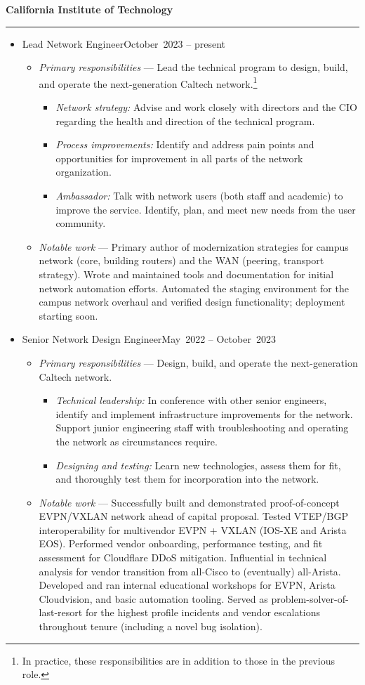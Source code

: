 \documentclass[10pt]{article}
\newenvironment{job}[5]
{
	\begin{leftcolumn*}
		\raggedleft{#3}
	\end{leftcolumn*}

	\begin{rightcolumn}
		\begin{itemize}[leftmargin=0em, itemindent=0em, labelsep=0.64em, topsep=0em, partopsep=0em]
			\item[\Large\textbullet]{#1}\hfill{}{#2}~{#3} -- {#4}~{#5}
			\begin{itemize}[leftmargin=1em, labelindent=\parindent]
}
{
			\end{itemize}
		\end{itemize}
	\end{rightcolumn}
}
\newenvironment{experience}
{
	\columnratio{0.05}
	\setlength{\columnsep}{2em}
	\setlength{\columnseprule}{0.4pt}
	\begin{paracol}{2}
}
{
	\end{paracol}
}
\newenvironment{employer}[1]
{
	\renewcommand{\employer}{{#1}}
	\begin{rightcolumn}
		\noindent\textbf{\employer}
		\smallskip
		{\color{lightgray}\hrule}
		\smallskip
	\end{rightcolumn}
}
{
	\let\employer\undefinedmacro
}
\begin{document}
\begin{experience}
	\begin{employer}{California Institute of Technology}
		\begin{job}{Lead Network Engineer}{October}{2023}{present}{}
			\item[]\emph{Primary responsibilities} --- Lead the technical program to design, build, and operate the next-generation Caltech network.\footnote{In practice, these responsibilities are in addition to those in the previous role.}
			\begin{itemize}
				\item\emph{Network strategy:} Advise and work closely with directors and the CIO regarding the health and direction of the technical program.
				\item\emph{Process improvements:} Identify and address pain points and opportunities for improvement in all parts of the network organization.
				\item\emph{Ambassador:} Talk with network users (both staff and academic) to improve the service. Identify, plan, and meet new needs from the user community.
			\end{itemize}
			\item[]\emph{Notable work} --- Primary author of modernization strategies for campus network (core, building routers) and the WAN (peering, transport strategy). Wrote and maintained tools and documentation for initial network automation efforts. Automated the staging environment for the campus network overhaul and verified design functionality; deployment starting soon.
		\end{job}
		\begin{job}{Senior Network Design Engineer}{May}{2022}{October}{2023}
			\item[]\emph{Primary responsibilities} --- Design, build, and operate the next-generation Caltech network.
			\begin{itemize}
				\item\emph{Technical leadership:} In conference with other senior engineers, identify and implement infrastructure improvements for the network. Support junior engineering staff with troubleshooting and operating the network as circumstances require.
				\item\emph{Designing and testing:} Learn new technologies, assess them for fit, and thoroughly test them for incorporation into the network.
			\end{itemize}
		\item[]\emph{Notable work} --- Successfully built and demonstrated proof-of-concept EVPN/VXLAN network ahead of capital proposal. Tested VTEP/BGP interoperability for multivendor EVPN + VXLAN (IOS-XE and Arista EOS). Performed vendor onboarding, performance testing, and fit assessment for Cloudflare DDoS mitigation. Influential in technical analysis for vendor transition from all-Cisco to (eventually) all-Arista. Developed and ran internal educational workshops for EVPN, Arista Cloudvision, and basic automation tooling. Served as problem-solver-of-last-resort for the highest profile incidents and vendor escalations throughout tenure (including a novel bug isolation).

\end{job}
\end{employer}
\end{experience}
\end{document}
